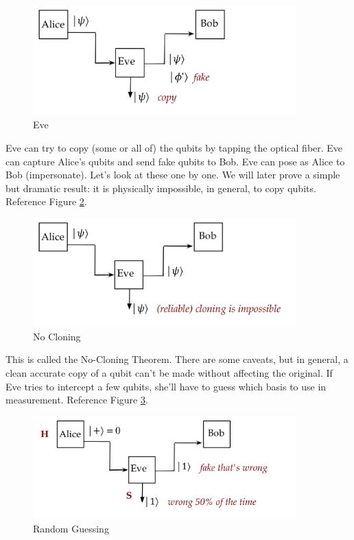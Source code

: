 \documentclass[main.tex]{subfiles}
\begin{document}
    \begin{figure}
        \centering
        \includegraphics[width=4in]{notes/figs/n05/45bb13.png}
        \caption{Eve}
        \label{fig:45bb13}
    \end{figure} 
    
    Eve can try to copy (some or all of) the qubits by tapping the optical fiber. Eve can capture Alice's qubits and send fake qubits to Bob. Eve can pose as Alice to Bob (impersonate). Let's look at these one by one. We will later prove a simple but dramatic result: it is physically impossible, in general, to copy qubits. Reference Figure \ref{fig:46bb14}.
 
    \begin{figure}
        \centering
        \includegraphics[width=4in]{notes/figs/n05/46bb14.png}
        \caption{No Cloning}
        \label{fig:46bb14}
    \end{figure}
    
    This is called the No-Cloning Theorem. There are some caveats, but in general, a clean accurate copy of a qubit can't be made without affecting the original. If Eve tries to intercept a few qubits, she'll have to guess which basis to use in measurement. Reference Figure \ref{fig:47bb15}.
    
    \begin{figure}
        \centering
        \includegraphics[width=4in]{notes/figs/n05/47bb15.png}
        \caption{Random Guessing}
        \label{fig:47bb15}
    \end{figure}  
    
\end{document}
